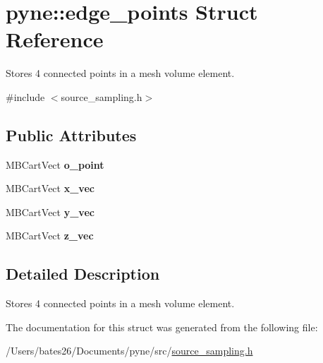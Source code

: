 \hypertarget{structpyne_1_1edge__points}{\section{pyne\+:\+:edge\+\_\+points Struct Reference}
\label{structpyne_1_1edge__points}
}


Stores 4 connected points in a mesh volume element.  




{\ttfamily \#include $<$source\+\_\+sampling.\+h$>$}

\subsection*{Public Attributes}
\begin{DoxyCompactItemize}
\item 
\hypertarget{structpyne_1_1edge__points_a4289acb1ad63358dae33259a58c26eae}{M\+B\+Cart\+Vect {\bfseries o\+\_\+point}}\label{structpyne_1_1edge__points_a4289acb1ad63358dae33259a58c26eae}

\item 
\hypertarget{structpyne_1_1edge__points_abb453892d25c56ff77f81f2d46acfe01}{M\+B\+Cart\+Vect {\bfseries x\+\_\+vec}}\label{structpyne_1_1edge__points_abb453892d25c56ff77f81f2d46acfe01}

\item 
\hypertarget{structpyne_1_1edge__points_a624251a41b0119e753ee5fefc5bdcc88}{M\+B\+Cart\+Vect {\bfseries y\+\_\+vec}}\label{structpyne_1_1edge__points_a624251a41b0119e753ee5fefc5bdcc88}

\item 
\hypertarget{structpyne_1_1edge__points_af38a69fcf9948fd9bd65bcd4ffe3e8c1}{M\+B\+Cart\+Vect {\bfseries z\+\_\+vec}}\label{structpyne_1_1edge__points_af38a69fcf9948fd9bd65bcd4ffe3e8c1}

\end{DoxyCompactItemize}


\subsection{Detailed Description}
Stores 4 connected points in a mesh volume element. 

The documentation for this struct was generated from the following file\+:\begin{DoxyCompactItemize}
\item 
/\+Users/bates26/\+Documents/pyne/src/\hyperlink{source__sampling_8h}{source\+\_\+sampling.\+h}\end{DoxyCompactItemize}
